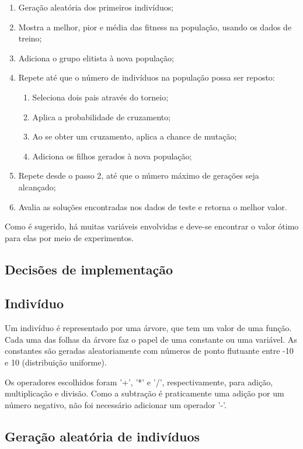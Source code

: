 \documentclass[11pt]{article}
\begin{document}
\begin{enumerate}
	\item Geração aleatória dos primeiros indivíduos;
	\item Mostra a melhor, pior e média das fitness na população, usando os dados de treino;
	\item Adiciona o grupo elitista à nova população;
	\item Repete até que o número de indivíduos na população possa ser reposto:
	\begin{enumerate}
		\item Seleciona dois pais através do torneio;
		\item Aplica a probabilidade de cruzamento;
		\item Ao se obter um cruzamento, aplica a chance de mutação;
		\item Adiciona os filhos gerados à nova população;
	\end{enumerate}
	\item Repete desde o passo 2, até que o número máximo de gerações seja alcançado;
	\item Avalia as soluções encontradas nos dados de teste e retorna o melhor valor.
\end{enumerate}

Como é sugerido, há muitas variáveis envolvidas e deve-se encontrar o valor ótimo para elas por meio de experimentos.

\subsection{Decisões de implementação}
  
\subsection*{Indivíduo}

Um indivíduo é representado por uma árvore, que tem um valor de uma função. Cada uma das folhas da árvore faz o papel de uma constante ou uma variável. As constantes são geradas aleatoriamente com números de ponto flutuante entre -10 e 10 (distribuição uniforme).

Os operadores escolhidos foram '+', '*' e '/', respectivamente, para adição, multiplicação e divisão. Como a subtração é praticamente uma adição por um número negativo, não foi necessário adicionar um operador '-'. 

\subsection*{Geração aleatória de indivíduos}
\end{document}
